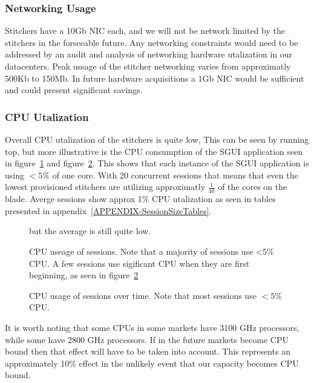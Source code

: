 \documentclass{article}
\begin{document}
\subsubsection{Networking Usage}
\label{SECTION-Networking}

Stitchers have a 10Gb NIC each, and we will not be network limited by the stitchers in the forseeable future. Any networking constraints would need to be addressed by an audit and analysis of networking hardware utalization in our datacenters. Peak ussage of the stitcher networking varies from approximatly 500Kb to 150Mb. In future hardware acquisitions a 1Gb NIC would be sufficient and could present significant savings. 

\subsubsection{CPU Utalization}
\label{SECTION-CPUUse}

Overall CPU utalization of the stitchers is quite low, This can be seen by running top, but more illustrative is the CPU consumption of the SGUI application seen in figure~\ref{FIGURE-CPUuse} and figure~\ref{FIGURE-CPUvsTime}. This shows that each instance of the SGUI application is using $<5\%$ of one core. With 20 concurrent sessions that means that even the lowest provisioned stitchers are utilizing approximatly $\frac{1}{40}$ of the cores on the blade. Averge sessions show approx 1\% CPU utalization as seen in tables presented in appendix~\ref{APPENDIX-SessionSizeTables}.

\begin{figure}[!htb]
        \caption{\label{FIGURE-CPUuse} CPU useage of sessions. Note that a majority of sessions use <5\% CPU.  A few sessions use sigificant CPU when they are first beginning, as seen in figure~\ref{FIGURE-CPUvsTime}} but the average is still quite low. 
\end{figure}

\begin{figure}[!htb]
        \caption{\label{FIGURE-CPUvsTime} CPU usage of sessions over time. Note that most sessions use $<5$\% CPU.}
\end{figure}

It is worth noting that some CPUs in some markets have 3100 GHz processors, while some have 2800 GHz processors. If in the future markets become CPU bound then that effect will have to be taken into account. This represents an approximately 10\% effect in the unlikely event that our capacity becomes CPU bound. 
\end{document}
